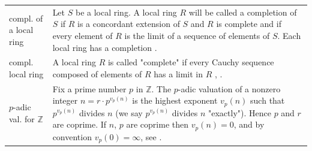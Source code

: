 \documentclass[12pt]{amsart}
\theoremstyle{definition}
\begin{document}
{\begin{table}[H]
\begin{tabular}{|P{1.4cm} p{13.4cm}|}
		\\
		compl. of a local ring & Let $S$ be a local ring. A local ring $R$ will be called a completion of $S$ if $R$ is a concordant extension of $S$ and $R$ is complete and if every element of $R$ is the limit of a sequence of elements of $S$. Each local ring has a completion \cite[p.~92]{Ref_Northcott_1953}.	 
		\\
		compl. local ring & A local ring $R$ is called "complete" if every Cauchy sequence composed of elements of $R$ has a limit in $R$ \cite[p.~85]{Ref_Northcott_1953}, \cite[p.~184]{Ref_Kemper_2011}.
		\\
		$p$-adic val. for $\mathbb{Z}$ & Fix a prime number $p$ in $\mathbb{Z}$. The $p$-adic valuation of a nonzero integer $n=r\cdot p^{v_p(n)}$ is the highest exponent $v_p(n)$ such that $p^{v_p(n)}$ divides $n$ (we say $p^{v_p(n)}$ divides $n$ "exactly"). Hence $p$ and $r$ are coprime. If $n$, $p$ are coprime then $v_p(n)=0$, and by convention $v_p(0)=\infty$, see \cite{Ref_Herwig_2011}.
		\\ \hline
	\end{tabular}
\end{table}}
\end{document}
